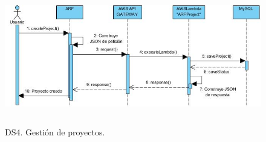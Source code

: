 \begin{figure}[h!]
	\centering
	\includegraphics[width=14cm,height=6cm]{imagenes/analisis/ds/CreateProject.jpg}
	\caption{DS4. Gestión de proyectos.}
	\label{fig:dsreccuenta}
\end{figure}
\clearpage


